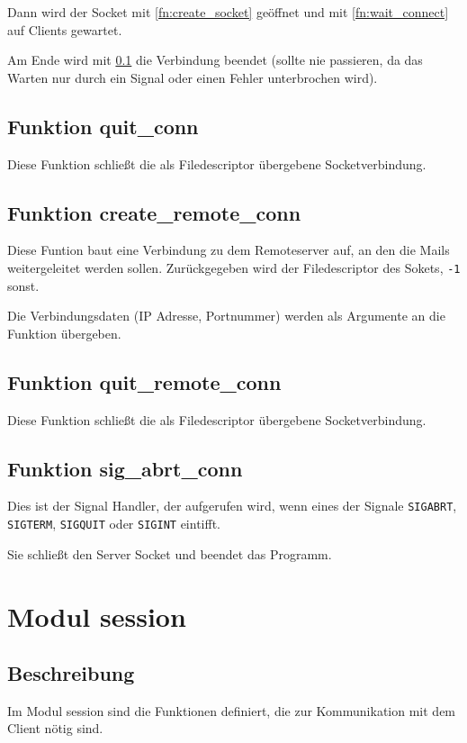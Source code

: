 \documentclass[pdftex,final,a4paper,10pt,notitlepage,halfparskip]{scrreprt}
\begin{document}
Dann wird der Socket mit \ref{fn:create_socket} geöffnet und mit \ref{fn:wait_connect} auf Clients gewartet.

Am Ende wird mit \ref{fn:quit_conn} die Verbindung beendet (sollte nie passieren, da das Warten nur durch ein Signal oder einen Fehler unterbrochen wird).


\subsection{Funktion quit\_conn}\label{fn:quit_conn}
Diese Funktion schließt die als Filedescriptor übergebene Socketverbindung.


\subsection{Funktion create\_remote\_conn}\label{fn:create_remote_conn}
Diese Funtion baut eine Verbindung zu dem Remoteserver auf, an den die Mails weitergeleitet werden sollen. Zurückgegeben wird der Filedescriptor des Sokets, \texttt{-1} sonst.

Die Verbindungsdaten (IP Adresse, Portnummer) werden als Argumente an die Funktion übergeben.

\subsection{Funktion quit\_remote\_conn}\label{fn:quit_remote_conn}
Diese Funktion schließt die als Filedescriptor übergebene Socketverbindung.

\subsection{Funktion sig\_abrt\_conn}\label{fn:sig_abrt_conn}
Dies ist der Signal Handler, der aufgerufen wird, wenn eines der Signale \texttt{SIGABRT}, \texttt{SIGTERM}, \texttt{SIGQUIT} oder \texttt{SIGINT} eintifft. 

Sie schließt den Server Socket und beendet das Programm.





\section{Modul session}\label{mod:session}
\subsection{Beschreibung}
Im Modul session sind die Funktionen definiert, die zur Kommunikation mit dem Client nötig sind. 
\end{document}
